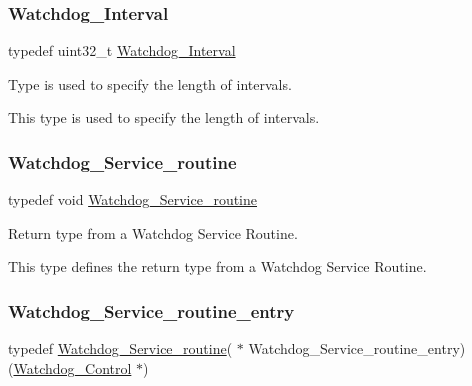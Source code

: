 \subsubsection{\texorpdfstring{Watchdog\_Interval}{Watchdog\_Interval}}
{\footnotesize\ttfamily typedef uint32\+\_\+t \mbox{\hyperlink{group__RTEMSScoreWatchdog_gaa1834fd7531ca9bb5c4ca6fd990388d5}{Watchdog\+\_\+\+Interval}}}



Type is used to specify the length of intervals. 

This type is used to specify the length of intervals. \mbox{\label{group__RTEMSScoreWatchdog_ga717c3247e44529ca6c68ead7baf52217}} 
\subsubsection{\texorpdfstring{Watchdog\_Service\_routine}{Watchdog\_Service\_routine}}
{\footnotesize\ttfamily typedef void \mbox{\hyperlink{group__RTEMSScoreWatchdog_ga717c3247e44529ca6c68ead7baf52217}{Watchdog\+\_\+\+Service\+\_\+routine}}}



Return type from a Watchdog Service Routine. 

This type defines the return type from a Watchdog Service Routine. \mbox{\label{group__RTEMSScoreWatchdog_ga6ae5e52f6c4046535272c18a8cba66e1}} 
\subsubsection{\texorpdfstring{Watchdog\_Service\_routine\_entry}{Watchdog\_Service\_routine\_entry}}
{\footnotesize\ttfamily typedef \mbox{\hyperlink{group__RTEMSScoreWatchdog_ga717c3247e44529ca6c68ead7baf52217}{Watchdog\+\_\+\+Service\+\_\+routine}}( $\ast$ Watchdog\+\_\+\+Service\+\_\+routine\+\_\+entry) (\mbox{\hyperlink{structWatchdog__Control}{Watchdog\+\_\+\+Control}} $\ast$)}



